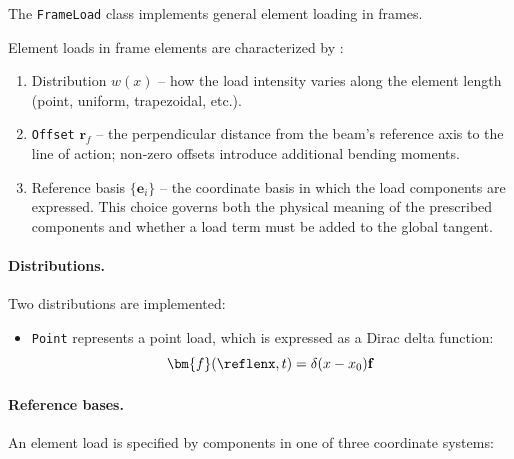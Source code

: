 
The \texttt{FrameLoad} class implements general element loading in frames. 

Element loads in frame elements are characterized by :
\begin{enumerate}
\item Distribution $w(x)$ – how the load intensity varies along the element length (point, uniform, trapezoidal, etc.).
\item \texttt{Offset} $\bm{r}_f$ – the perpendicular distance from the beam’s reference axis to the line of action; non-zero offsets introduce additional bending moments.
\item Reference basis $\{\mathbf{e}_i\}$ – the coordinate basis in which the load components are expressed.  This choice governs both the physical meaning of the prescribed components and whether a load term must be added to the global tangent.
\end{enumerate}

\paragraph{Distributions.} 
Two distributions are implemented:
\begin{itemize}
    \item \texttt{Point} represents a point load, which is expressed as a Dirac delta function:
    \[
    \bm{f}(\reflenx,t) = \delta(x-x_0) \mathbf{f} \,  
    \]
\end{itemize}

\paragraph{Reference bases.}
An element load is specified by components in one of three coordinate systems:

